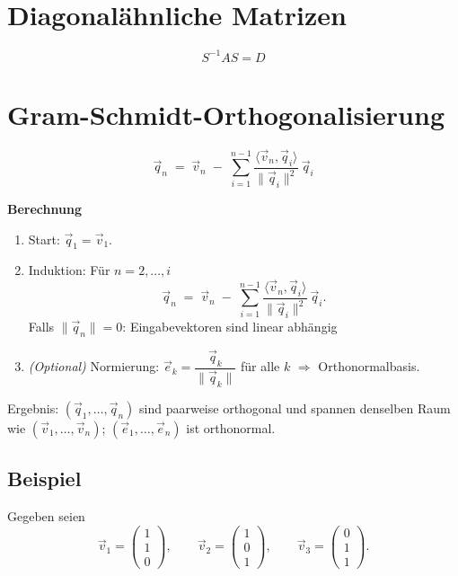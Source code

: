 \documentclass[a4paper,11pt,oneside,open=any,parskip=half, DIV=15]{scrreprt}
\begin{document}
\section{Diagonalähnliche Matrizen}

   \begin{importantbox}
      \[
         S^{-1}AS = D
      \]
   \end{importantbox}

\newpage
\section{Gram-Schmidt-Orthogonalisierung}

   \begin{importantbox}
      \[
         \vec q_n \;=\; \vec v_n \;-\; \sum_{i=1}^{n-1} \frac{\langle \vec v_n,\vec q_i\rangle}{\|\vec q_i\|^{2}}\,\vec q_i
      \]
   \end{importantbox}

   \textbf{Berechnung}
   \begin{enumerate}
      \item Start: \(\vec q_1=\vec v_1\).
      \item Induktion: Für \(n=2,\dots,i\)
      \[
      \vec q_n \;=\; \vec v_n \;-\; \sum_{i=1}^{n-1} \frac{\langle \vec v_n,\vec q_i\rangle}{\|\vec q_i\|^{2}}\,\vec q_i.
      \]
      Falls \(\|\vec q_n\|=0\): Eingabevektoren sind linear abhängig
      \item \emph{(Optional)} Normierung: \(\vec e_k=\dfrac{\vec q_k}{\|\vec q_k\|}\) für alle \(k\) \(\Rightarrow\) Orthonormalbasis.
   \end{enumerate}

   Ergebnis: \((\vec q_1,\dots,\vec q_n)\) sind paarweise orthogonal und spannen denselben Raum wie \((\vec v_1,\dots,\vec v_n)\); \((\vec e_1,\dots,\vec e_n)\) ist orthonormal.

   \subsection*{Beispiel}

   Gegeben seien
   \[
      \vec v_1=\begin{pmatrix}1\\[2pt]1\\[2pt]0\end{pmatrix},\qquad
      \vec v_2=\begin{pmatrix}1\\[2pt]0\\[2pt]1\end{pmatrix},\qquad
      \vec v_3=\begin{pmatrix}0\\[2pt]1\\[2pt]1\end{pmatrix}.
   \]
\end{document}
